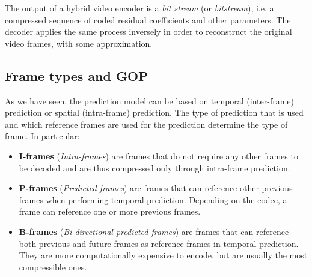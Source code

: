 

The output of a hybrid video encoder is a \textit{bit stream} (or \textit{bitstream}), i.e. a compressed sequence of coded residual coefficients and other parameters. The decoder applies the same process inversely in order to reconstruct the original video frames, with some approximation.

\subsection{Frame types and GOP}
\label{sec:bg/compression/gop}

As we have seen, the prediction model can be based on temporal (inter-frame) prediction or spatial (intra-frame) prediction. The type of prediction that is used and which reference frames are used for the prediction determine the type of frame. In particular:

\begin{itemize}
    \item \textbf{I-frames} (\textit{Intra-frames}) are frames that do not require any other frames to be decoded and are thus compressed only through intra-frame prediction.
    \item \textbf{P-frames} (\textit{Predicted frames}) are frames that can reference other previous frames when performing temporal prediction. Depending on the codec, a frame can reference one or more previous frames.
    \item \textbf{B-frames} (\textit{Bi-directional predicted frames}) are frames that can reference both previous and future frames as reference frames in temporal prediction. They are more computationally expensive to encode, but are usually the most compressible ones.
\end{itemize}

